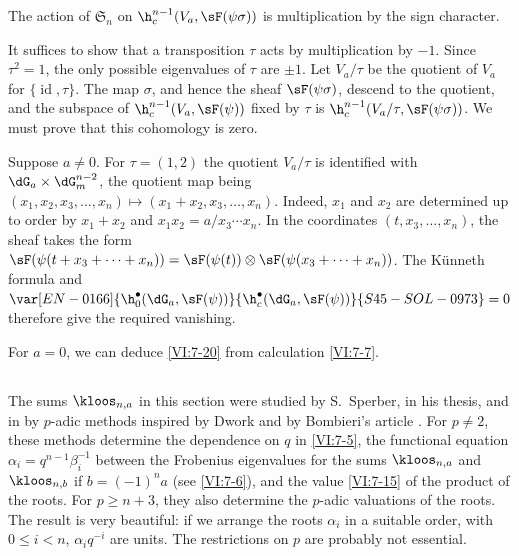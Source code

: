 \begin{proposition_}\label{VI:7-20}
The action of $\mathfrak{S}_n$ on $\h_c^{n-1}(V_a,\sF(\psi\sigma))$ is multiplication 
by the sign character. 
\end{proposition_}

It suffices to show that a transposition $\tau$ acts by multiplication 
by $-1$. Since $\tau^2=1$, the only possible eigenvalues of $\tau$ are 
$\pm 1$. Let $V_a/\tau$ be the quotient of $V_a$ for 
$\{\operatorname{id},\tau\}$. The map $\sigma$, and hence the sheaf 
$\sF(\psi\sigma)$, descend to the quotient, and the subspace of 
  $\h_c^{n-1}(V_a,\sF(\psi))$ fixed by 
$\tau$ is $\h_c^{n-1}(V_a/\tau,\sF(\psi\sigma))$. We must prove that 
this cohomology is zero. 

Suppose $a\ne 0$. For $\tau=(1,2)$ the quotient $V_a/\tau$ is identified 
with $\dG_a\times \dG_m^{n-2}$, the quotient map being 
$(x_1,x_2,x_3,\dots,x_n)\mapsto (x_1+x_2,x_3,\dots,x_n)$. Indeed, $x_1$ and 
$x_2$ are determined 
up to order by $x_1+x_2$ and 
$x_1x_2 = a/x_3\dotsm x_n$. In the coordinates $(t,x_3,\dots,x_n)$, the 
sheaf takes the form 
$\sF(\psi(t+x_3+\cdots + x_n)) = \sF(\psi(t))\otimes \sF(\psi(x_3+\cdots + x_n))$. 
  The K\"unneth formula and $\var[EN-0166]{\h_0^\bullet(\dG_a,\sF(\psi))}{\h_c^\bullet(\dG_a,\sF(\psi))}{S45-SOL-0973} = 0$ therefore give 
the required vanishing. 

For $a=0$, we can deduce \ref{VI:7-20} from calculation \ref{VI:7-7}. 





\subsection{}\label{VI:7-21}

The sums $\kloos_{n,a}$ in this section were studied by 
S.\ Sperber, in his thesis, and in  by 
$p$-adic methods inspired by Dwork and by Bombieri's article . 
For $p\ne 2$, these methods determine the dependence on $q$ in \ref{VI:7-5}, 
the functional equation $\alpha_i = q^{n-1} \beta_i^{-1}$ between the 
Frobenius eigenvalues for the sums $\kloos_{n,a}$ and 
$\kloos_{n,b}$ if $b=(-1)^n a$ (see \ref{VI:7-6}), and the value \ref{VI:7-15} 
of the product of the roots. For $p\geqslant n+3$, they also determine the 
$p$-adic valuations of the roots. The result is very beautiful: if we arrange 
the roots $\alpha_i$ in a suitable order, with 
  $0\leqslant i<n$, $\alpha_i q^{-i}$ are units. The 
restrictions on $p$ are probably not essential. 












